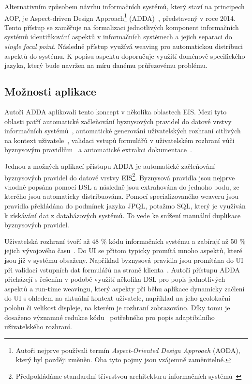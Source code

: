 Alternativním způsobem návrhu informačních systémů, který staví na principech \gls{AOP},
je Aspect-driven Design Approach\footnote{Autoři nejprve používali termín \textit{Aspect-Oriented
Design Approach} (AODA), který byl později změněn. Oba tyto pojmy jsou vzájemně zaměnitelné.}
(\gls{ADDA})~\cite{cemus2014aspect}, představený v roce 2014.
Tento přístup se zaměřuje na formalizaci jednotlivých komponent informačních systémů identifikování aspektů
v informačních systémech a jejich separaci do \textit{single focal point}.
Následně přístup využívá weaving pro automatickou distribuci aspektů do systému.
K popisu aspektu doporučuje využití doménově specifického jazyka, který bude navržen na
míru danému průřezovému problému.

\subsection{Možnosti aplikace}

Autoři \gls{ADDA} aplikovali tento koncept v několika oblastech \gls{EIS}.
Mezi tyto oblasti patří automatické začleňování byznysových pravidel
do datové vrstvy informačních systémů~\cite{cemus2015automated}, automatické
generování uživatelských rozhraní citlivých na kontext uživatele~\cite{cemus2017separation},
validaci vstupů formulářů v uživatelském rozhraní vůči byznysovým pravidlům~\cite{cemus2016context}\cite{cemus2017separation}
a automatické extrakci dokumentace~\cite{cemus2017automated}.

Jednou z možných aplikací přístupu \gls{ADDA} je automatické začleňování
byznysových pravidel do datové vrstvy \gls{EIS}\footnote{Předpokládáme standardní
třívrstvou architekturu informačních systémů~\cite{fowler2002patterns}}.
Byznysová pravidla jsou nejprve vhodně popsána pomocí \gls{DSL} a následně jsou
extrahována do jednoho bodu, ze kterého jsou automaticky distribuována.
Pomocí specializovaného weaveru jsou pravidla překládána do podmínek
jazyka \gls{JPQL}, potažmo \gls{SQL}, který je využíván k získávání dat
z databázových systémů. To vede ke snížení manuální duplikace byznysových
pravidel.

Uživatelská rozhraní tvoří až 48 \% kódu informačních systému
a zabírají až 50 \% jejich vývojového času~\cite{kennard2009separation}.
Do \gls{UI} se přitom typicky promítá mnoho aspektů, které jsou
již v systému obsaženy. Například byznysová pravidla jsou promítána do \gls{UI}
při validaci vstupních dat formulářů na straně klienta~\cite{cemus2017separation}.
Autoři přístupu \gls{ADDA} přicházejí s řešením v podobě
využití několika \gls{DSL} pro popis jednotlivých aspektů
a run-time weavingu, který aspekty při běhu aplikace
dynamicky začlení do \gls{UI} s ohledem na aktuální kontext
uživatele, například na jeho geolokační polohu či velikost
displeje, na kterém je rozhraní zobrazováno.
Díky tomu je dosaženo významné redukce kódu~\cite{cemus2016context}
potřebného pro popis adaptibilního uživatelského rozhraní.

